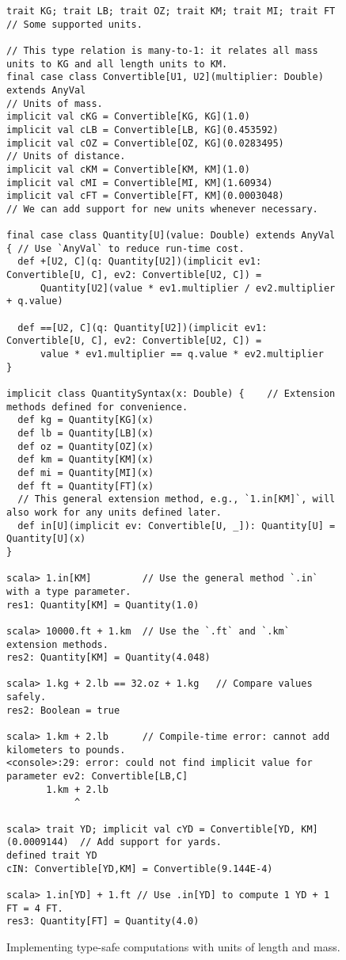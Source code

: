 \begin{figure}
\begin{lstlisting}[frame=single,fillcolor={\color{black}},framesep={0.2mm},framexleftmargin=2mm,framexrightmargin=2mm,framextopmargin=2mm,framexbottommargin=2mm]
trait KG; trait LB; trait OZ; trait KM; trait MI; trait FT             // Some supported units.

// This type relation is many-to-1: it relates all mass units to KG and all length units to KM.
final case class Convertible[U1, U2](multiplier: Double) extends AnyVal
// Units of mass.
implicit val cKG = Convertible[KG, KG](1.0)
implicit val cLB = Convertible[LB, KG](0.453592)
implicit val cOZ = Convertible[OZ, KG](0.0283495)
// Units of distance.
implicit val cKM = Convertible[KM, KM](1.0)
implicit val cMI = Convertible[MI, KM](1.60934)
implicit val cFT = Convertible[FT, KM](0.0003048)
// We can add support for new units whenever necessary.

final case class Quantity[U](value: Double) extends AnyVal { // Use `AnyVal` to reduce run-time cost.
  def +[U2, C](q: Quantity[U2])(implicit ev1: Convertible[U, C], ev2: Convertible[U2, C]) =
      Quantity[U2](value * ev1.multiplier / ev2.multiplier + q.value)

  def ==[U2, C](q: Quantity[U2])(implicit ev1: Convertible[U, C], ev2: Convertible[U2, C]) =
      value * ev1.multiplier == q.value * ev2.multiplier
}

implicit class QuantitySyntax(x: Double) {    // Extension methods defined for convenience.
  def kg = Quantity[KG](x)
  def lb = Quantity[LB](x)
  def oz = Quantity[OZ](x)
  def km = Quantity[KM](x)
  def mi = Quantity[MI](x)
  def ft = Quantity[FT](x)
  // This general extension method, e.g., `1.in[KM]`, will also work for any units defined later.
  def in[U](implicit ev: Convertible[U, _]): Quantity[U] = Quantity[U](x)
}

scala> 1.in[KM]         // Use the general method `.in` with a type parameter.
res1: Quantity[KM] = Quantity(1.0)

scala> 10000.ft + 1.km  // Use the `.ft` and `.km` extension methods.
res2: Quantity[KM] = Quantity(4.048)

scala> 1.kg + 2.lb == 32.oz + 1.kg   // Compare values safely.
res2: Boolean = true

scala> 1.km + 2.lb      // Compile-time error: cannot add kilometers to pounds.
<console>:29: error: could not find implicit value for parameter ev2: Convertible[LB,C]
       1.km + 2.lb
            ^

scala> trait YD; implicit val cYD = Convertible[YD, KM](0.0009144)  // Add support for yards.
defined trait YD
cIN: Convertible[YD,KM] = Convertible(9.144E-4)

scala> 1.in[YD] + 1.ft // Use .in[YD] to compute 1 YD + 1 FT = 4 FT.
res3: Quantity[FT] = Quantity(4.0)
\end{lstlisting}

\caption{Implementing type-safe computations with units of length and mass.\label{fig:Full-code-implementing-units-length-mass}}
\end{figure}


